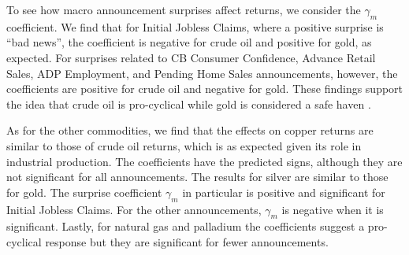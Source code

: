 To see how macro announcement surprises  affect returns, we consider the $\gamma_m$ coefficient.  We find that for Initial Jobless Claims, where a positive surprise is ``bad news'', the coefficient is negative for crude oil and positive for gold, as expected. For surprises related to CB Consumer Confidence, Advance Retail Sales, ADP Employment, and Pending Home Sales announcements, however, the coefficients are positive for crude oil and negative for gold. These findings support the idea that crude oil is pro-cyclical while gold is considered a safe haven  \citep[see e.g.,][]{lucey2015precious}.


As for the other commodities, we find that the effects on copper returns are similar to those of crude oil returns, which is as expected given its role in industrial production. The coefficients have the predicted signs, although they are not significant for all announcements. The results for silver are similar to those for gold. The  surprise coefficient $\gamma_m$ in particular is positive and significant for Initial Jobless Claims. For the other announcements, $\gamma_m$ is negative when it is significant. Lastly,  for natural gas and palladium the coefficients suggest a pro-cyclical response but they are significant for fewer announcements. 

